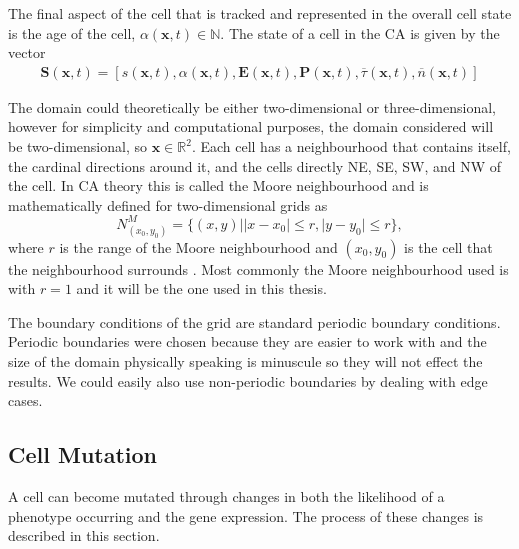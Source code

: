 \documentclass[\main/thesis.tex]{subfiles}
\begin{document}
The final aspect of the cell that is tracked and represented in the overall cell state is the age of the cell, $\alpha(\boldsymbol{x}, t) {\in} \mathbb{N}$. The state of a cell in the CA is given by the vector
\begin{align}
\boldsymbol{S}(\boldsymbol{x}, t) {=} [ s(\boldsymbol{x}, t), %
                                        \alpha(\boldsymbol{x}, t), %
                                        \boldsymbol{E}(\boldsymbol{x}, t), %
                                        \boldsymbol{P}(\boldsymbol{x}, t), %
                                        \overline{\tau}(\boldsymbol{x}, t), %
                                        \overline{n}(\boldsymbol{x}, t) ] %
\label{eq:StateVector}
\end{align}

The domain could theoretically be either two-dimensional or \newline three-dimensional, however for simplicity and computational purposes, the domain considered will be two-dimensional, so $\boldsymbol{x} {\in} \mathbb{R}^2$. Each cell has a neighbourhood that contains itself, the cardinal directions 
around it, and the cells directly NE, SE, SW, and NW of the cell. In CA theory this is called the Moore neighbourhood and is mathematically defined for two-dimensional grids as
\begin{equation}
N^M_{(x_0, y_0)} {=} \{ (x, y) | |x {-} x_0| {\le} r, |y {-} y_0| {\le} r \},
\label{eq:MooreNeighbourhood}
\end{equation}
where $r$ is the range of the Moore neighbourhood and $(x_0, y_0)$ is the cell that the neighbourhood 
surrounds \cite{Gray}. Most commonly the Moore neighbourhood used is with $r {=} 1$ and it will be the one used in this thesis. 

The boundary conditions of the grid are standard periodic boundary conditions. 
Periodic boundaries were chosen because they are easier to work with and the size of the domain physically speaking is minuscule so they will not effect the results. We could easily also use non-periodic boundaries by dealing with edge cases.

\subsection{Cell Mutation}
A cell can become mutated through changes in both the likelihood of a phenotype 
occurring and the gene expression. The process of these changes is described in 
this section.
\end{document}
